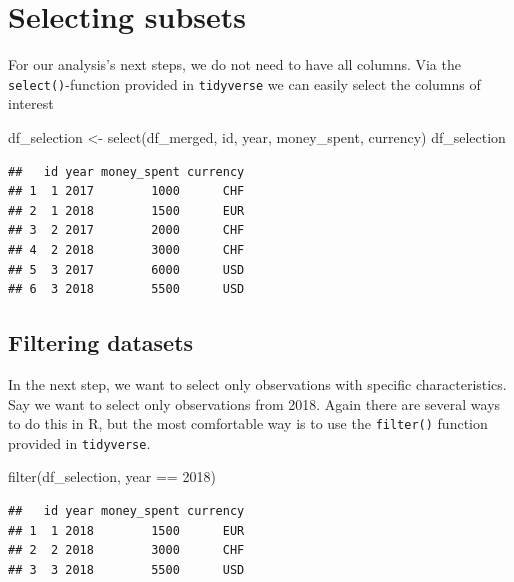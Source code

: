 \documentclass[
  12pt,
]{style/krantz}
\newenvironment{Shaded}{\begin{snugshade}}{\end{snugshade}}
\newcommand{\DecValTok}[1]{\textcolor[rgb]{0.00,0.00,0.81}{#1}}
\newcommand{\FunctionTok}[1]{\textcolor[rgb]{0.00,0.00,0.00}{#1}}
\newcommand{\NormalTok}[1]{#1}
\newcommand{\OtherTok}[1]{\textcolor[rgb]{0.56,0.35,0.01}{#1}}
\newcommand{\SpecialCharTok}[1]{\textcolor[rgb]{0.00,0.00,0.00}{#1}}
\begin{document}
\hypertarget{selecting-subsets}{%
\section{Selecting subsets}\label{selecting-subsets}}

For our analysis's next steps, we do not need to have all columns. Via the \texttt{select()}-function provided in \texttt{tidyverse} we can easily select the columns of interest

\begin{Shaded}
\begin{Highlighting}[]
\NormalTok{df\_selection }\OtherTok{\textless{}{-}} \FunctionTok{select}\NormalTok{(df\_merged, id, year, money\_spent, currency)}
\NormalTok{df\_selection}
\end{Highlighting}
\end{Shaded}

\begin{verbatim}
##   id year money_spent currency
## 1  1 2017        1000      CHF
## 2  1 2018        1500      EUR
## 3  2 2017        2000      CHF
## 4  2 2018        3000      CHF
## 5  3 2017        6000      USD
## 6  3 2018        5500      USD
\end{verbatim}

\hypertarget{filtering-datasets}{%
\subsection{Filtering datasets}\label{filtering-datasets}}

In the next step, we want to select only observations with specific characteristics. Say we want to select only observations from 2018. Again there are several ways to do this in R, but the most comfortable way is to use the \texttt{filter()} function provided in \texttt{tidyverse}.

\begin{Shaded}
\begin{Highlighting}[]
\FunctionTok{filter}\NormalTok{(df\_selection, year }\SpecialCharTok{==} \DecValTok{2018}\NormalTok{)}
\end{Highlighting}
\end{Shaded}

\begin{verbatim}
##   id year money_spent currency
## 1  1 2018        1500      EUR
## 2  2 2018        3000      CHF
## 3  3 2018        5500      USD
\end{verbatim}
\end{document}
